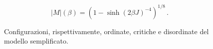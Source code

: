 \documentclass[Lau, noexaminfo, oneside]{sapthesis} %
\begin{document}
\begin{equation}
|M|(\beta) = (1-\sinh(2\beta J)^{-4})^{1/8} \,.
\label{eqonsager}
\end{equation}
\begin{figure}[H]
\hspace{10pt}
\hspace{10pt}
\centering
\caption{Configurazioni, rispettivamente, ordinate, critiche e disordinate del modello semplificato.}
\end{figure}
\end{document}
